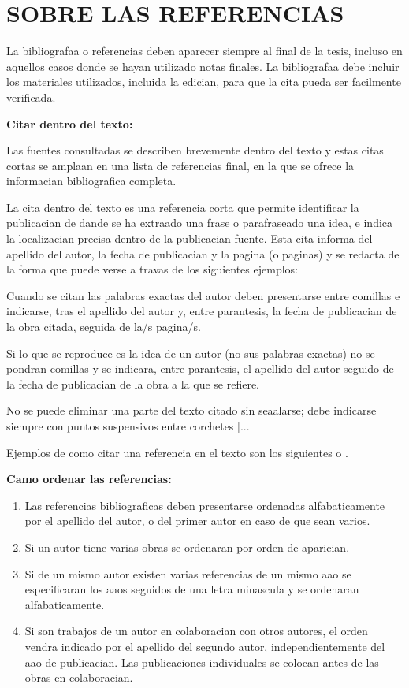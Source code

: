 \section{SOBRE LAS REFERENCIAS}

La bibliografaa o referencias deben aparecer siempre al final de la tesis, incluso en aquellos casos donde se hayan utilizado notas finales. La bibliografaa debe incluir los materiales utilizados, incluida la edician, para que la cita pueda ser facilmente verificada. 

\bigskip
{\bf Citar dentro del texto:}

Las fuentes consultadas se describen brevemente dentro del texto y estas citas cortas se amplaan en una lista de referencias final, en la que se ofrece la informacian bibliografica completa. 

La cita dentro del texto es una referencia corta que permite identificar la publicacian de dande se ha extraado una frase o parafraseado una idea, e indica la localizacian precisa dentro de la publicacian fuente. Esta cita informa del apellido del autor, la fecha de publicacian y la pagina (o paginas) y se redacta de la forma que puede verse a travas de los siguientes ejemplos:

Cuando se citan las palabras exactas del autor deben presentarse entre comillas e indicarse, tras el apellido del autor y, entre parantesis, la fecha de publicacian de la obra citada, seguida de la/s pagina/s.

Si lo que se reproduce es la idea de un autor (no sus palabras exactas) no se pondran comillas y se indicara, entre parantesis, el apellido del autor seguido de la fecha de publicacian de la obra a la que se refiere.

No se puede eliminar una parte del texto citado sin seaalarse; debe indicarse siempre con puntos suspensivos entre corchetes [...]

Ejemplos de como citar una referencia en el texto son los siguientes \cite{Ashtiani2014} o \cite{Ashtiani2014,Mateos2009,Vicente2016}.


\bigskip
{\bf Camo ordenar las referencias:}
\begin{enumerate}
\item Las referencias bibliograficas deben presentarse ordenadas alfabaticamente por el apellido del autor, o del primer autor en caso de que sean varios.
\item Si un autor tiene varias obras se ordenaran por orden de aparician.
\item Si de un mismo autor existen varias referencias de un mismo aao se especificaran los aaos seguidos de una letra minascula y se ordenaran alfabaticamente.
\item Si son trabajos de un autor en colaboracian con otros autores, el orden vendra indicado por el apellido del segundo autor, independientemente del aao de publicacian. Las publicaciones individuales se colocan antes de las obras en colaboracian.
\end{enumerate}


